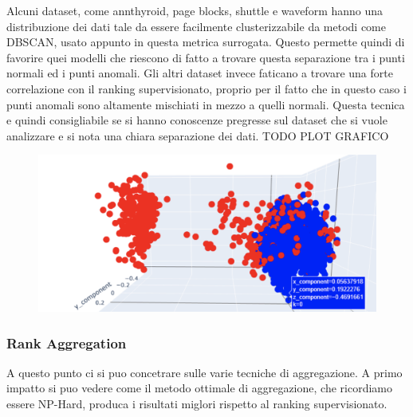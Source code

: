 Alcuni dataset, come annthyroid, page blocks, shuttle e waveform hanno una distribuzione dei dati tale da essere facilmente clusterizzabile da metodi come DBSCAN, usato appunto in questa metrica surrogata. Questo permette quindi di favorire quei modelli che riescono di fatto a trovare questa separazione tra i punti normali ed i punti anomali.
Gli altri dataset invece faticano a trovare una forte correlazione con il ranking supervisionato, proprio per il fatto che in questo caso i punti anomali sono altamente mischiati in mezzo a quelli normali.
Questa tecnica e quindi consigliabile se si hanno conoscenze pregresse sul dataset che si vuole analizzare e si nota una chiara separazione dei dati.
TODO PLOT GRAFICO
\begin{figure}[t]
\includegraphics[width=14cm, scale=1]{images/plot-anomalies-normal}
\centering
\end{figure}

\subsubsection{Rank Aggregation}
A questo punto ci si puo concetrare sulle varie tecniche di aggregazione. A primo impatto si puo vedere come il metodo ottimale di aggregazione, che ricordiamo essere NP-Hard, produca i risultati miglori rispetto al ranking supervisionato. 


